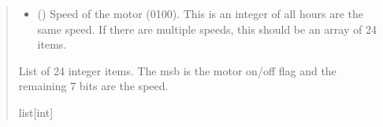 \documentclass[letterpaper,10pt,english]{sphinxmanual}
\begin{document}
\begin{fulllineitems}
\begin{fulllineitems}
\begin{quote}
\begin{description}
\begin{itemize}
\item {} 
\sphinxAtStartPar
{} (\sphinxstyleliteralemphasis{\sphinxupquote{ | }}\sphinxstyleliteralemphasis{\sphinxupquote{ | }}\sphinxstyleliteralemphasis{\sphinxupquote{{[}}}\sphinxstyleliteralemphasis{\sphinxupquote{{]}}}) \textendash{} Speed of the motor (0\sphinxhyphen{}100). This is an integer of all hours                 are the same speed. If there are multiple speeds, this should be an array of 24 items.

\end{itemize}

\sphinxAtStartPar
List of 24 integer items. The msb is the motor on/off flag and the remaining 7 bits                 are the speed.

\sphinxAtStartPar
list{[}int{]}

\end{description}\end{quote}

\end{fulllineitems}


\begin{fulllineitems}
\label{\detokenize{Morelia.Devices:Morelia.Devices.PodDevice_8229.Pod8229.DecodeDayAndSchedule}}
\pysigstartsignatures
{}
\pysigstopsignatures
\end{fulllineitems}



\end{fulllineitems}
\end{document}

